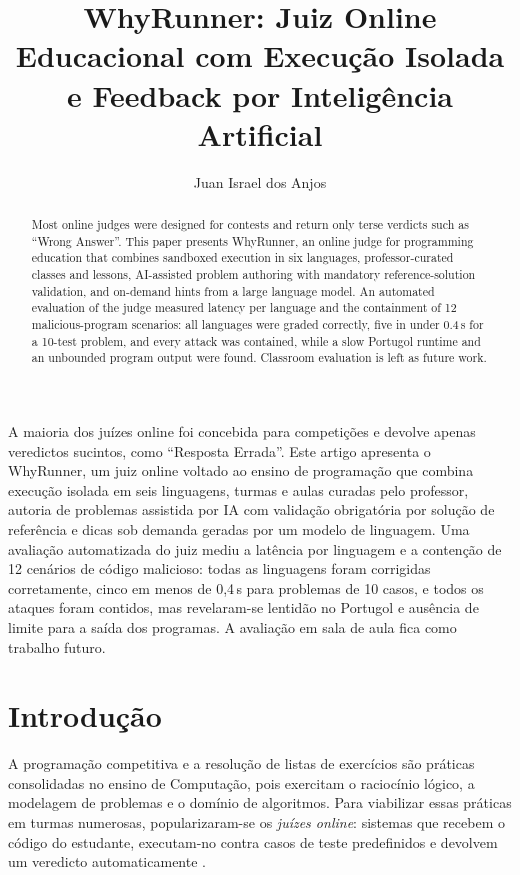 \documentclass[12pt]{article}
\title{WhyRunner: Juiz Online Educacional com Execução Isolada\\e Feedback por Inteligência Artificial}
\author{Juan Israel dos Anjos}
\begin{document}
\maketitle

\begin{abstract}
  Most online judges were designed for contests and return only terse verdicts such as ``Wrong Answer''. This paper presents WhyRunner, an online judge for programming education that combines sandboxed execution in six languages, professor-curated classes and lessons, AI-assisted problem authoring with mandatory reference-solution validation, and on-demand hints from a large language model. An automated evaluation of the judge measured latency per language and the containment of 12 malicious-program scenarios: all languages were graded correctly, five in under 0.4\,s for a 10-test problem, and every attack was contained, while a slow Portugol runtime and an unbounded program output were found. Classroom evaluation is left as future work.
\end{abstract}

\begin{resumo}
  A maioria dos juízes online foi concebida para competições e devolve apenas veredictos sucintos, como ``Resposta Errada''. Este artigo apresenta o WhyRunner, um juiz online voltado ao ensino de programação que combina execução isolada em seis linguagens, turmas e aulas curadas pelo professor, autoria de problemas assistida por IA com validação obrigatória por solução de referência e dicas sob demanda geradas por um modelo de linguagem. Uma avaliação automatizada do juiz mediu a latência por linguagem e a contenção de 12 cenários de código malicioso: todas as linguagens foram corrigidas corretamente, cinco em menos de 0,4\,s para problemas de 10 casos, e todos os ataques foram contidos, mas revelaram-se lentidão no Portugol e ausência de limite para a saída dos programas. A avaliação em sala de aula fica como trabalho futuro.
\end{resumo}

\section{Introdução}

A programação competitiva e a resolução de listas de exercícios são práticas consolidadas no ensino de Computação, pois exercitam o raciocínio lógico, a modelagem de problemas e o domínio de algoritmos. Para viabilizar essas práticas em turmas numerosas, popularizaram-se os \emph{juízes online}: sistemas que recebem o código do estudante, executam-no contra casos de teste predefinidos e devolvem um veredicto automaticamente \cite{wasik2018survey}.
\end{document}
